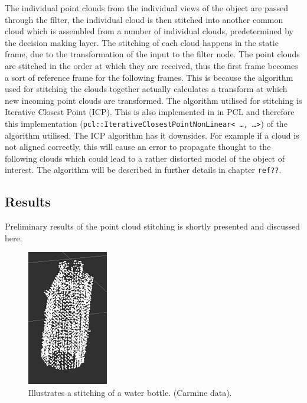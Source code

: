The individual point clouds from the individual views of the object are passed through the filter, the individual cloud is then stitched into another common cloud which is assembled from a number of individual clouds, predetermined by the decision making layer. The stitching of each cloud happens in the static frame, due to the transformation of the input to the filter node. The point clouds are stitched in the order at which they are received, thus the first frame becomes a sort of reference frame for the following frames. This is because the algorithm used for stitching the clouds together actually calculates a transform at which new incoming point clouds are transformed. The algorithm utilised for stitching is Iterative Closest Point (ICP). This is also implemented in in PCL and therefore this implementation (\texttt{pcl::IterativeClosestPointNonLinear< \ldots , \ldots >}) of the algorithm utilised. The ICP algorithm has it downsides. For example if a cloud is not aligned correctly, this will cause an error to propagate thought to the following clouds which could lead to a rather distorted model of the object of interest\cite{choe2007registration}. The algorithm will be described in further details in chapter \texttt{ref??}.

\subsection{Results}
Preliminary results of the point cloud stitching is shortly presented and discussed here. 

\begin{figure}[htb]
	\begin{center}
		\includegraphics[scale=0.7,trim=0 0 0 0]{graphics/07_modelling/bottle.png}%
		\caption{Illustrates a stitching of a water bottle. (Carmine data).}
		\label{fig:bottle}
	\end{center}
\end{figure}

